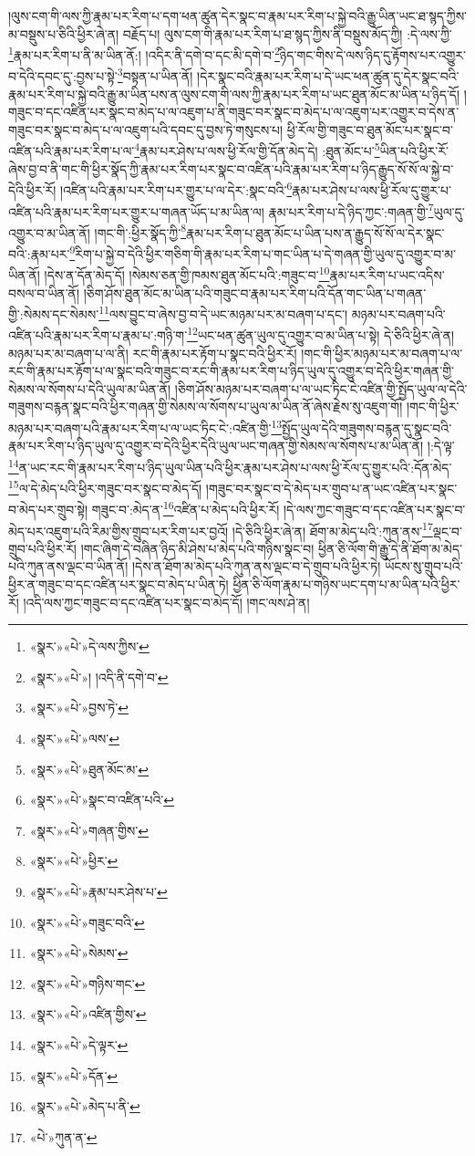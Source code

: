 །ལུས་ངག་གི་ལས་ཀྱི་རྣམ་པར་རིག་པ་དག་ཕན་ཚུན་དེར་སྣང་བ་རྣམ་པར་རིག་པ་སྐྱེ་བའི་རྒྱུ་ཡིན་ཡང་ཐ་སྙད་ཀྱིས་མ་བསྡུས་པ་ཅིའི་ཕྱིར་ཞེ་ན། བརྗོད་པ། ལུས་ངག་གི་རྣམ་པར་རིག་པ་ཐ་སྙད་ཀྱིས་ནི་བསྡུས་མོད་ཀྱི། :དེ་ལས་ཀྱི་\footnote{«སྣར་»«པེ་»དེ་ལས་ཀྱིས་}རྣམ་པར་རིག་པ་ནི་མ་ཡིན་ནོ:། །འདིར་ནི་དགེ་བ་དང་མི་དགེ་བ་\footnote{«སྣར་»«པེ་»། །འདི་ནི་དགེ་བ་}ཉིད་གང་གིས་དེ་ལས་ཉིད་དུ་རྟོགས་པར་འགྱུར་བ་དེའི་དབང་དུ་:བྱས་པ་སྟེ་\footnote{«སྣར་»«པེ་»བྱས་ཏེ་}བསྟན་པ་ཡིན་ནོ། །དེར་སྣང་བའི་རྣམ་པར་རིག་པ་དེ་ཡང་ཕན་ཚུན་དུ་དེར་སྣང་བའི་རྣམ་པར་རིག་པ་སྐྱེ་བའི་རྒྱུ་མ་ཡིན་པས་ན་ལུས་ངག་གི་ལས་ཀྱི་རྣམ་པར་རིག་པ་ཡང་ཐུན་མོང་མ་ཡིན་པ་ཉིད་དོ། །
གཟུང་བ་དང་འཛིན་པར་སྣང་བ་མེད་པ་ལ་འཇུག་པ་ནི་གཟུང་བར་སྣང་བ་མེད་པ་ལ་འཇུག་པར་འགྱུར་བ་དེས་ན་གཟུང་བར་སྣང་བ་མེད་པ་ལ་འཇུག་པའི་དབང་དུ་བྱས་ཏེ་གསུངས་པ། ཕྱི་རོལ་གྱི་གཟུང་བ་ཐུན་མོང་པར་སྣང་བ་འཛིན་པའི་རྣམ་པར་རིག་པ་ལ་\footnote{«སྣར་»«པེ་»ལས་}རྣམ་པར་ཤེས་པ་ལས་ཕྱི་རོལ་གྱི་དོན་མེད་དེ། :ཐུན་མོང་པ་\footnote{«སྣར་»«པེ་»ཐུན་མོང་མ་}ཡིན་པའི་ཕྱིར་རོ་ཞེས་བྱ་བ་ནི་གང་གི་ཕྱིར་སྣོད་ཀྱི་རྣམ་པར་རིག་པར་སྣང་བ་འཛིན་པའི་རྣམ་པར་རིག་པ་ཉིད་རྒྱུད་སོ་སོ་ལ་སྐྱེ་བ་དེའི་ཕྱིར་རོ། །འཛིན་པའི་རྣམ་པར་རིག་པར་གྱུར་པ་ལ་དེར་:སྣང་བའི་\footnote{«སྣར་»«པེ་»སྣང་བ་འཛིན་པའི་}རྣམ་པར་ཤེས་པ་ལས་ཕྱི་རོལ་དུ་གྱུར་པ་འཛིན་པའི་རྣམ་པར་རིག་པར་གྱུར་པ་གཞན་ཡོད་པ་མ་ཡིན་ལ། རྣམ་པར་རིག་པ་དེ་ཉིད་ཀྱང་:གཞན་གྱི་\footnote{«སྣར་»«པེ་»གཞན་གྱིས་}ཡུལ་དུ་འགྱུར་བ་མ་ཡིན་ནོ། །གང་གི་:ཕྱིར་སྣོད་ཀྱི་\footnote{«སྣར་»«པེ་»ཕྱིར་}རྣམ་པར་རིག་པ་ཐུན་མོང་པ་ཡིན་པས་ན་རྒྱུད་སོ་སོ་ལ་དེར་སྣང་བའི་:རྣམ་པར་\footnote{«སྣར་»«པེ་»རྣམ་པར་ཤེས་པ་}རིག་པ་སྐྱེ་བ་དེའི་ཕྱིར་གཅིག་གི་རྣམ་པར་རིག་པ་གང་ཡིན་པ་དེ་གཞན་གྱི་ཡུལ་དུ་འགྱུར་བ་མ་ཡིན་ནོ། །དེས་ན་དོན་མེད་དོ། །སེམས་ཅན་གྱི་ཁམས་ཐུན་མོང་པའི་:གཟུང་བ་\footnote{«སྣར་»«པེ་»གཟུང་བའི་}རྣམ་པར་རིག་པ་ཡང་འདིས་བསལ་བ་ཡིན་ནོ། །ཅིག་ཤོས་ཐུན་མོང་མ་ཡིན་པའི་གཟུང་བ་རྣམ་པར་རིག་པའི་དོན་གང་ཡིན་པ་གཞན་གྱི་:སེམས་དང་སེམས་\footnote{«སྣར་»«པེ་»སེམས་}ལས་བྱུང་བ་ཞེས་བྱ་བ་དེ་ཡང་མཉམ་པར་མ་བཞག་པ་དང་། མཉམ་པར་བཞག་པའི་འཛིན་པའི་རྣམ་པར་རིག་པ་རྣམ་པ་:གཉི་ག་\footnote{«སྣར་»«པེ་»གཉིས་གང་}ཡང་ཕན་ཚུན་ཡུལ་དུ་འགྱུར་བ་མ་ཡིན་པ་སྟེ། དེ་ཅིའི་ཕྱིར་ཞེ་ན། མཉམ་པར་མ་བཞག་པ་ལ་ནི། རང་གི་རྣམ་པར་རྟོག་པ་སྣང་བའི་ཕྱིར་རོ། །གང་གི་ཕྱིར་མཉམ་པར་མ་བཞག་པ་ལ་རང་གི་རྣམ་པར་རྟོག་པ་ལ་སྣང་བའི་གཟུང་བ་རང་གི་རྣམ་པར་རིག་པ་ཉིད་ཡུལ་དུ་འགྱུར་བ་དེའི་ཕྱིར་གཞན་གྱི་སེམས་ལ་སོགས་པ་དེའི་ཡུལ་མ་ཡིན་ནོ། །ཅིག་ཤོས་མཉམ་པར་བཞག་པ་ལ་ཡང་ཏིང་ངེ་འཛིན་གྱི་སྤྱོད་ཡུལ་ལ་དེའི་གཟུགས་བརྙན་སྣང་བའི་ཕྱིར་གཞན་གྱི་སེམས་ལ་སོགས་པ་ཡུལ་མ་ཡིན་ནོ་ཞེས་རྗེས་སུ་འཇུག་གོ། །གང་གི་ཕྱིར་མཉམ་པར་བཞག་པའི་རྣམ་པར་རིག་པ་ལ་ཡང་ཏིང་ངེ་:འཛིན་གྱི་\footnote{«སྣར་»«པེ་»འཛིན་གྱིས་}སྤྱོད་ཡུལ་དེའི་གཟུགས་བརྙན་དུ་སྣང་བའི་རྣམ་པར་རིག་པ་ཉིད་ཡུལ་དུ་འགྱུར་བ་དེའི་ཕྱིར་དེའི་ཡུལ་ཡང་གཞན་གྱི་སེམས་ལ་སོགས་པ་མ་ཡིན་ནོ། །:དེ་ལྟ་\footnote{«སྣར་»«པེ་»དེ་ལྟར་}ན་ཡང་རང་གི་རྣམ་པར་རིག་པ་ཉིད་ཡུལ་ཡིན་པའི་ཕྱིར་རྣམ་པར་ཤེས་པ་ལས་ཕྱི་རོལ་དུ་གྱུར་པའི་:དོན་མེད་\footnote{«སྣར་»«པེ་»དོན་}ལ་དེ་མེད་པའི་ཕྱིར་གཟུང་བར་སྣང་བ་མེད་དོ། །གཟུང་བར་སྣང་བ་དེ་མེད་པར་གྲུབ་པ་ན་ཡང་འཛིན་པར་སྣང་བ་མེད་པར་གྲུབ་སྟེ། གཟུང་བ་:མེད་ན་\footnote{«སྣར་»«པེ་»མེད་པ་ནི་}འཛིན་པ་མེད་པའི་ཕྱིར་རོ། །དེ་ལས་ཀྱང་གཟུང་བ་དང་འཛིན་པར་སྣང་བ་མེད་པར་འཇུག་པའི་རིམ་གྱིས་གྲུབ་པར་རིག་པར་བྱའོ། །དེ་ཅིའི་ཕྱིར་ཞེ་ན། ཐོག་མ་མེད་པའི་:ཀུན་ནས་\footnote{«པེ་»ཀུན་ན་}ལྡང་བ་གྲུབ་པའི་ཕྱིར་རོ། །གང་ཞིག་དེ་བཞིན་ཉིད་མི་ཤེས་པ་མེད་པའི་གཉིས་སྣང་བ། ཕྱིན་ཅི་ལོག་གི་རྒྱུ་དེ་ནི་ཐོག་མ་མེད་པའི་ཀུན་ནས་ལྡང་བ་ཡིན་ནོ། །དེས་ན་ཐོག་མ་མེད་པའི་ཀུན་ནས་ལྡང་བ་དེ་གྲུབ་པའི་ཕྱིར་ཏེ། ཡོངས་སུ་གྲུབ་པའི་ཕྱིར་ན་གཟུང་བ་དང་འཛིན་པར་སྣང་བ་མེད་པ་ཡིན་ཏེ། ཕྱིན་ཅི་ལོག་རྣམ་པ་གཉིས་ཡང་དག་པ་མ་ཡིན་པའི་ཕྱིར་རོ། །འདི་ལས་ཀྱང་གཟུང་བ་དང་འཛིན་པར་སྣང་བ་མེད་དོ། །གང་ལས་ཤེ་ན། 